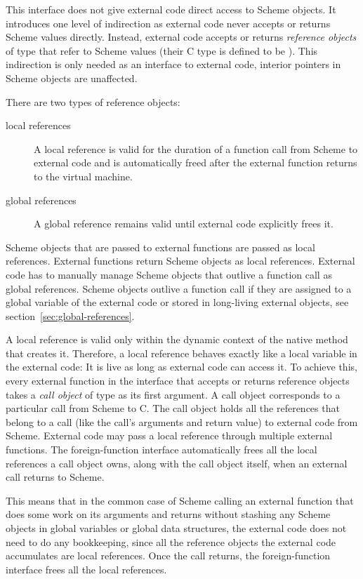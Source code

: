 This interface does not give external code direct access to Scheme
objects.  It introduces one level of indirection as external code never
accepts or returns Scheme values directly.  Instead, external code
accepts or returns \emph{reference objects} of type 
that refer to Scheme values (their C type is defined to be
).  This indirection is only needed as an interface
to external code, interior pointers in Scheme objects are unaffected.

There are two types of reference objects:
%
\begin{description}
\item[local references] A local reference is valid for the duration of
  a function call from Scheme to external code and is automatically
  freed after the external function returns to the virtual machine.

\item[global references] A global reference remains valid until
  external code explicitly frees it.
\end{description}
%
Scheme objects that are passed to external functions are
passed as local references.  External functions return Scheme objects
as local references.  External code has to manually manage Scheme
objects that outlive a function call as global references.  Scheme
objects outlive a function call if they are assigned to a global
variable of the external code or stored in long-living external
objects, see section~\ref{sec:global-references}.

A local reference is valid only within the dynamic context of the
native method that creates it.  Therefore, a local reference behaves
exactly like a local variable in the external code: It is live as long
as external code can access it.  To achieve this, every external
function in the interface that accepts or returns reference objects
takes a \emph{call object} of type  as its first
argument.  A call object corresponds to a particular call from Scheme
to C.  The call object holds all the references that belong to a call
(like the call's arguments and return value) to external code from
Scheme.  External code may pass a local reference through multiple
external functions.  The foreign-function interface automatically
frees all the local references a call object owns, along with the call
object itself, when an external call returns to Scheme.

This means that in the common case of Scheme calling an external
function that does some work on its arguments and returns without
stashing any Scheme objects in global variables or global data
structures, the external code does not need to do any bookkeeping,
since all the reference objects the external code accumulates are
local references.  Once the call returns, the foreign-function
interface frees all the local references.


